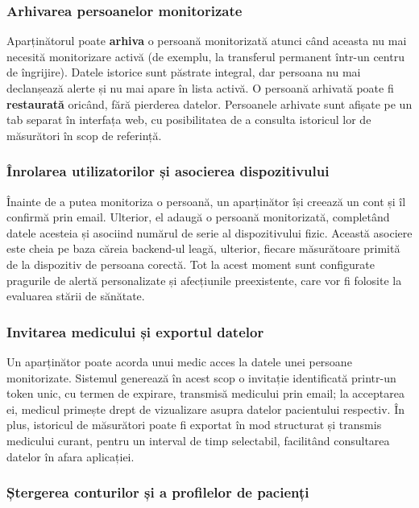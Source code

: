 \documentclass[12pt,a4paper,twoside]{article}
\begin{document}
\subsubsection{Arhivarea persoanelor monitorizate}

Aparținătorul poate \textbf{arhiva} o persoană monitorizată atunci când aceasta nu mai necesită monitorizare activă (de exemplu, la transferul permanent într-un centru de îngrijire). Datele istorice sunt păstrate integral, dar persoana nu mai declanșează alerte și nu mai apare în lista activă. O persoană arhivată poate fi \textbf{restaurată} oricând, fără pierderea datelor. Persoanele arhivate sunt afișate pe un tab separat în interfața web, cu posibilitatea de a consulta istoricul lor de măsurători în scop de referință.

\subsubsection{Înrolarea utilizatorilor și asocierea dispozitivului}

Înainte de a putea monitoriza o persoană, un aparținător își creează un cont și îl confirmă prin email. Ulterior, el adaugă o persoană monitorizată, completând datele acesteia și asociind numărul de serie al dispozitivului fizic. Această asociere este cheia pe baza căreia backend-ul leagă, ulterior, fiecare măsurătoare primită de la dispozitiv de persoana corectă. Tot la acest moment sunt configurate pragurile de alertă personalizate și afecțiunile preexistente, care vor fi folosite la evaluarea stării de sănătate.

\subsubsection{Invitarea medicului și exportul datelor}

Un aparținător poate acorda unui medic acces la datele unei persoane monitorizate. Sistemul generează în acest scop o invitație identificată printr-un token unic, cu termen de expirare, transmisă medicului prin email; la acceptarea ei, medicul primește drept de vizualizare asupra datelor pacientului respectiv. În plus, istoricul de măsurători poate fi exportat în mod structurat și transmis medicului curant, pentru un interval de timp selectabil, facilitând consultarea datelor în afara aplicației.

\subsubsection{Ștergerea conturilor și a profilelor de pacienți}
\end{document}

